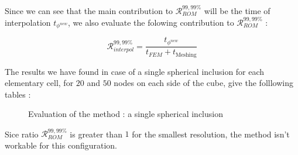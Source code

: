 {Since we can see that the main contribution to $\mathcal{R}_{ROM}^{99,99\%}$ will be the time of interpolation $t_{\phi^{new}}$, %
we also evaluate the folowing contribution to $\mathcal{R}_{ROM}^{99,99\%}$ :

\begin{equation}
\label{eval_interp}
\mathcal{R}_{interpol}^{99,99\%}=\dfrac{t_{\phi^{new}}}{t_{FEM}+t_{\text{Meshing}}}
\end{equation}

The results we have found in case of a single spherical inclusion for each elementary cell, for $20$ and $50$ nodes on each side of the cube, give the folllowing tables :

\begin{figure}[H]%
%
\begin{table}[H]
\begin{center}
%
%
\qquad
{}%
%
\end{center}
\end{table}
%
\caption{Evaluation of the method : a single spherical inclusion}
\end{figure}

\etoile
\newlength{\currentparskip}
\setlength{\currentparskip}{\parskip}
\begin{minipage}{\linewidth}
\setlength{\parskip}{\currentparskip}
Sice ratio $\mathcal{R}_{ROM}^{99,99\%}$ is greater than $1$ for the smallest resolution, %
the method isn't workable for this configuration.


\end{minipage}}
